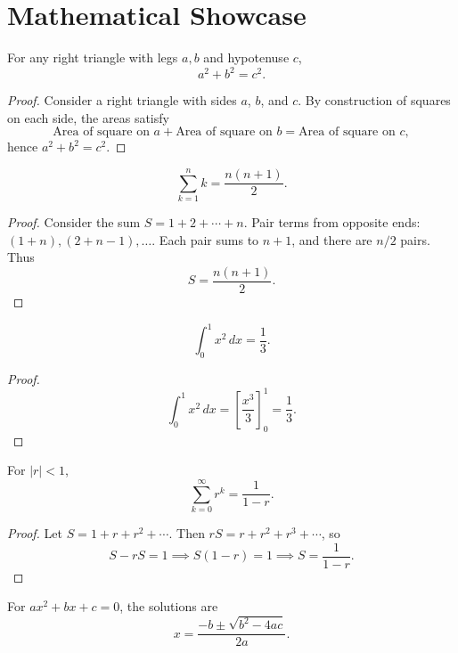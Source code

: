 \section{Mathematical Showcase}

\begin{theorem}[Pythagoras]
For any right triangle with legs $a,b$ and hypotenuse $c$,
\[
a^2 + b^2 = c^2.
\]
\end{theorem}

\begin{proof}
Consider a right triangle with sides $a$, $b$, and $c$. By construction of squares on each side, the areas satisfy
\[
\text{Area of square on } a + \text{Area of square on } b = \text{Area of square on } c,
\]
hence $a^2 + b^2 = c^2$.
\end{proof}

\begin{theorem}
\[
\sum_{k=1}^{n} k = \frac{n(n+1)}{2}.
\]
\end{theorem}

\begin{proof}
Consider the sum $S = 1 + 2 + \cdots + n$. Pair terms from opposite ends: $(1+n), (2+n-1), \dots$. Each pair sums to $n+1$, and there are $n/2$ pairs. Thus
\[
S = \frac{n(n+1)}{2}.
\]
\end{proof}

\begin{theorem}
\[
\int_0^1 x^2 \, dx = \frac{1}{3}.
\]
\end{theorem}

\begin{proof}
\[
\int_0^1 x^2 \, dx = \left[ \frac{x^3}{3} \right]_0^1 = \frac{1}{3}.
\]
\end{proof}

\begin{theorem}
For $|r|<1$,
\[
\sum_{k=0}^{\infty} r^k = \frac{1}{1-r}.
\]
\end{theorem}

\begin{proof}
Let $S = 1 + r + r^2 + \cdots$. Then $rS = r + r^2 + r^3 + \cdots$, so
\[
S - rS = 1 \implies S(1-r) = 1 \implies S = \frac{1}{1-r}.
\]
\end{proof}

\begin{theorem}
For $ax^2 + bx + c = 0$, the solutions are
\[
x = \frac{-b \pm \sqrt{b^2 - 4ac}}{2a}.
\]
\end{theorem}


